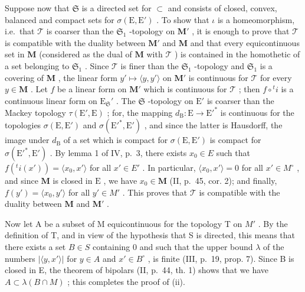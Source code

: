 Suppose now that \(\mathfrak{S}\) is a directed set for \(\subset\) and consists of closed, convex, balanced and compact sets for \(\sigma(\mathrm{E},\mathrm{E}')\) . To show that \(\iota\) is a homeomorphism, i.e.~that \(\mathcal{T}\) is coarser than the \(\mathfrak{S}_1\) -topology on \(\mathbf{M}'\) , it is enough to prove that \(\mathcal{T}\) is compatible with the duality between \(\mathbf{M}'\) and \(\mathbf{M}\) and that every equicontinuous set in \(\mathbf{M}\) (considered as the dual of \(\mathbf{M}\) with \(\mathcal{T}\) ) is contained in the homothetic of a set belonging to \(\mathfrak{S}_1\) . Since \(\mathcal{T}\) is finer than the \(\mathfrak{S}_1\) -topology and \(\mathfrak{S}_1\) is a covering of \(\mathbf{M}\) , the linear form \(y' \mapsto \langle y, y' \rangle\) on \(\mathbf{M}'\) is continuous for \(\mathcal{T}\) for every \(y \in \mathbf{M}\) . Let \(f\) be a linear form on \(\mathbf{M}'\) which is continuous for \(\mathcal{T}\) ; then \(f \circ {}^t i\) is a continuous linear form on \(\mathrm{E}_{\mathfrak{S}}'\) . The \(\mathfrak{S}\) -topology on \(\mathrm{E}'\) is coarser than the Mackey topology \(\tau(\mathrm{E}',\mathrm{E})\) ; for, the mapping \(d_{\mathrm{B}}: \mathrm{E} \to \mathrm{E}'^*\) is continuous for the topologies \(\sigma(\mathrm{E},\mathrm{E}')\) and \(\sigma(\mathrm{E}'^*,\mathrm{E}')\) , and since the latter is Hausdorff, the image under \(d_{\mathrm{B}}\) of a set which is compact for \(\sigma(\mathrm{E},\mathrm{E}')\) is compact for \(\sigma(\mathrm{E}'^*,\mathrm{E}')\) . By lemma 1 of IV, p.~3, there exists \(x_0 \in E\) such that \(f(^t i(x')) = \langle x_0, x' \rangle\) for all \(x' \in E'\) . In particular, \(\langle x_0, x' \rangle = 0\) for all \(x' \in M^\circ\) , and since \(\mathbf{M}\) is closed in \(\mathrm{E}\) , we have \(x_0 \in \mathbf{M}\) (II, p.~45, cor. 2); and finally, \(f(y') = \langle x_0, y' \rangle\) for all \(y' \in M'\) . This proves that \(\mathcal{T}\) is compatible with the duality between \(\mathbf{M}\) and \(\mathbf{M}'\) .

Now let A be a subset of M equicontinuous for the topology T on \(M'\) . By the definition of T, and in view of the hypothesis that S is directed, this means that there exists a set \(B \in S\) containing 0 and such that the upper bound \(\lambda\) of the numbers \(\left|\langle y, x'\rangle\right|\) for \(y \in A\) and \(x' \in B^{\circ}\) , is finite (III, p.~19, prop. 7). Since B is closed in E, the theorem of bipolars (II, p.~44, th. 1) shows that we have \(A \subset \lambda(B \cap M)\) ; this completes the proof of (ii).

